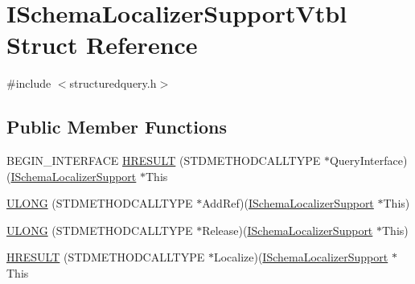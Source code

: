 \hypertarget{struct_i_schema_localizer_support_vtbl}{}\section{I\+Schema\+Localizer\+Support\+Vtbl Struct Reference}
\label{struct_i_schema_localizer_support_vtbl}


{\ttfamily \#include $<$structuredquery.\+h$>$}

\subsection*{Public Member Functions}
\begin{DoxyCompactItemize}
\item 
B\+E\+G\+I\+N\+\_\+\+I\+N\+T\+E\+R\+F\+A\+CE \hyperlink{struct_i_schema_localizer_support_vtbl_afd18a5dfc1db8273e8e156339332180a}{H\+R\+E\+S\+U\+LT} (S\+T\+D\+M\+E\+T\+H\+O\+D\+C\+A\+L\+L\+T\+Y\+PE $\ast$Query\+Interface)(\hyperlink{structuredquery_8h_a8e28e35aee8684b664d1bbf9c126ff86}{I\+Schema\+Localizer\+Support} $\ast$This
\item 
\hyperlink{struct_i_schema_localizer_support_vtbl_a8f42707f2af449fe8592d858153c16ee}{U\+L\+O\+NG} (S\+T\+D\+M\+E\+T\+H\+O\+D\+C\+A\+L\+L\+T\+Y\+PE $\ast$Add\+Ref)(\hyperlink{structuredquery_8h_a8e28e35aee8684b664d1bbf9c126ff86}{I\+Schema\+Localizer\+Support} $\ast$This)
\item 
\hyperlink{struct_i_schema_localizer_support_vtbl_a32ad3a14d10bf36a2680e5f912bc75c4}{U\+L\+O\+NG} (S\+T\+D\+M\+E\+T\+H\+O\+D\+C\+A\+L\+L\+T\+Y\+PE $\ast$Release)(\hyperlink{structuredquery_8h_a8e28e35aee8684b664d1bbf9c126ff86}{I\+Schema\+Localizer\+Support} $\ast$This)
\item 
\hyperlink{struct_i_schema_localizer_support_vtbl_a0ef9a16de13a7a5dace8ca9c9c61d533}{H\+R\+E\+S\+U\+LT} (S\+T\+D\+M\+E\+T\+H\+O\+D\+C\+A\+L\+L\+T\+Y\+PE $\ast$Localize)(\hyperlink{structuredquery_8h_a8e28e35aee8684b664d1bbf9c126ff86}{I\+Schema\+Localizer\+Support} $\ast$This
\end{DoxyCompactItemize}
